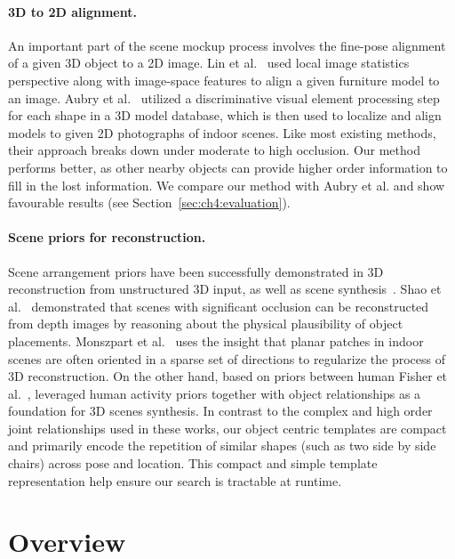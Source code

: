 \documentclass[10pt,twocolumn,letterpaper]{article}
\begin{document}
\paragraph{3D to 2D alignment.} An important part of the scene mockup process
involves the fine-pose alignment of a given 3D object to a 2D image. 
Lin et al.~\cite{Lim:2013:ICCV} used local image
statistics perspective along with image-space features to align a given furniture
model to an image. Aubry et al.~\cite{Aubry:2014:CVPR} utilized a
discriminative visual element processing step for each shape in a 3D model
database, which is then used to localize and align models to given 2D
photographs of indoor scenes. Like most existing methods, their approach breaks
down under moderate to high occlusion. Our method performs better, as
other nearby objects can provide higher order information to fill in the lost
information. We compare our method with Aubry et al. and show
favourable results (see Section~\ref{sec:ch4:evaluation}).

\paragraph{Scene priors for reconstruction.} Scene arrangement priors have been
successfully demonstrated in 3D reconstruction from unstructured 3D input, as
well as scene synthesis~\cite{Fisher:2012:SIGGASIA}. Shao et al.~\cite{Shao:2014:SIGGRAPH}
demonstrated that scenes with significant occlusion can be reconstructed from depth
images by reasoning about the physical plausibility of object placements.
Monszpart et al.~\cite{Monszpart:2015:SIGGRAPH} uses the insight that
planar patches in indoor scenes are often oriented in a sparse set of
directions to regularize the process of 3D reconstruction. On the other hand,
based on priors between human  Fisher et al.~\cite{Fisher:2015:SIGGRAPH},
leveraged human activity priors together with object relationships as a
foundation for 3D scenes synthesis. In contrast to the complex and high order
joint relationships used in these works, our object centric templates are
compact and primarily encode the repetition of similar shapes (such as two side
by side chairs) across pose and location.  This compact and simple template
representation help ensure our search is tractable at runtime. 
\section{Overview}
\end{document}
